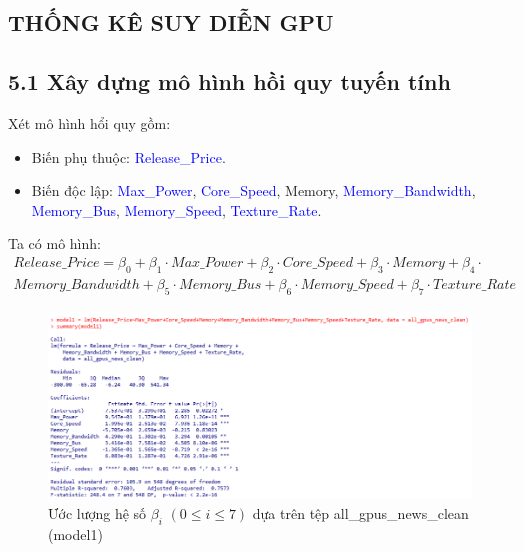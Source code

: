 \documentclass[a4paper]{article}
\newcommand{\gachdau}{\hspace*{1.5em}\ignorespaces}
\begin{document}
\newpage
    \begin{center}
        \section*{THỐNG KÊ SUY DIỄN GPU}
    \end{center}
        \subsection*{5.1 Xây dựng mô hình hồi quy tuyến tính}
            \gachdau
            Xét mô hình hổi quy gồm:
            \begin{itemize}[leftmargin=3.5em, itemsep=-1.5em, parsep=1.6em]
                \vspace{-6pt}
                \item \fontsize{13pt}{15pt}\selectfont Biến phụ thuộc: \textcolor{blue}{Release\_Price}.
                \item \fontsize{13pt}{15pt}\selectfont Biến độc lập: \textcolor{blue}{Max\_Power}, \textcolor{blue}{Core\_Speed}, Memory, \textcolor{blue}{Memory\_Bandwidth}, \textcolor{blue}{Memory\_Bus}, \textcolor{blue}{Memory\_Speed}, \textcolor{blue}{Texture\_Rate}.
            \end{itemize}
            \vspace{-7pt}
            \gachdau
            Ta có mô hình:
            \vspace{-18pt}
            \begin{align*}
                Release\_Price = \beta_0 + \beta_1 \cdot Max\_Power + \beta_2 \cdot Core\_Speed + \beta_3 \cdot Memory + \beta_4 \cdot \\
                Memory\_Bandwidth + \beta_5 \cdot Memory\_Bus + \beta_6 \cdot Memory\_Speed + \beta_7 \cdot Texture\_Rate
            \end{align*}
            \begin{figure}[H]
                \vspace{-18pt}
                \centering
                \includegraphics[width=\linewidth]{4. GPU/Thống kê suy diễn/model1.png}
                \caption{Ước lượng hệ số $\beta_i$ $(0 \leq i \leq 7)$ dựa trên tệp all\_gpus\_news\_clean (model1)}
            \end{figure}
\end{document}
